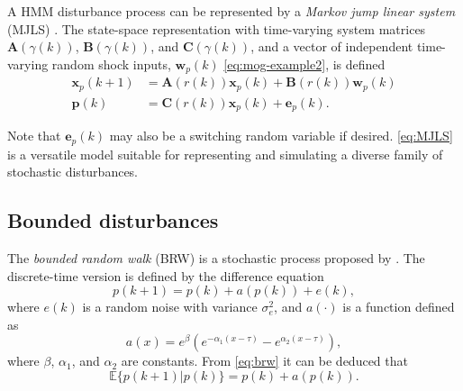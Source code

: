 A \gls{HMM} disturbance process can be represented by a \textit{Markov jump linear system} (\acrshort{MJLS}) \citep{costa_discrete-time_2005}. The state-space representation with time-varying system matrices $\mathbf{A}(\gamma(k))$, $\mathbf{B}(\gamma(k))$, and $\mathbf{C}(\gamma(k))$, and a vector of independent time-varying random shock inputs, $\mathbf{w}_p(k)$ \eqref{eq:mog-example2}, is defined
\begin{equation} \label{eq:MJLS}
	\begin{aligned}
	\mathbf{x}_p(k+1) &= \mathbf{A}(r(k)) \mathbf{x}_p(k) + \mathbf{B}(r(k))\mathbf{w}_p(k) \\
	\mathbf{p}(k) &= \mathbf{C}(r(k)) \mathbf{x}_p(k) + \mathbf{e}_p(k).
	\end{aligned}
\end{equation}

Note that $\mathbf{e}_p(k)$ may also be a switching random variable if desired. \eqref{eq:MJLS} is a versatile model suitable for representing and simulating a diverse family of stochastic disturbances.

\subsection{Bounded disturbances} \label{sec:bounded}

The \textit{bounded random walk} (\gls{BRW}) is a stochastic process proposed by \cite{nicolau_stationary_2002}. The discrete-time version is defined by the difference equation
\begin{equation} \label{eq:brw}
		p(k+1) = p(k) + a(p(k)) + e(k),
\end{equation}
where $e(k)$ is a random noise with variance $\sigma_e^2$, and $a(\cdot)$ is a function defined as
%
%
%
%
\begin{equation}
	a(x) = e^{\beta}\left(e^{-\alpha_{1}\left(x - \tau\right)} - e^{\alpha_{2}\left(x - \tau\right)}\right),
\end{equation}
where $\beta$, $\alpha_{1}$, and $\alpha_{2}$ are constants.  From \eqref{eq:brw} it can be deduced that
\begin{equation}
	\mathbb{E}\{p(k+1)|p(k)\} = p(k) + a(p(k)).
\end{equation}

